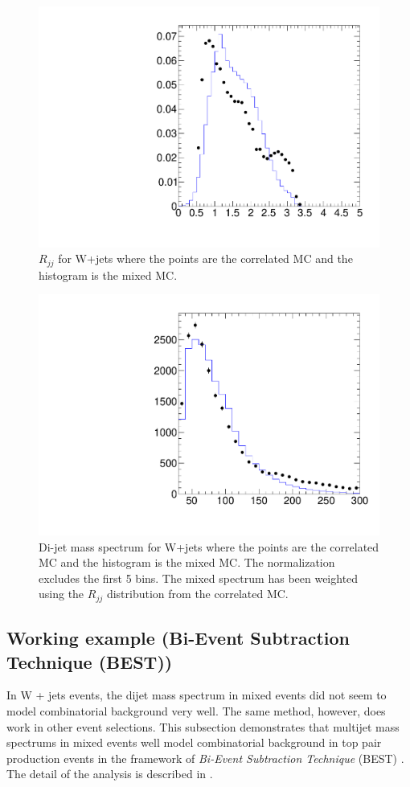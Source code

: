 \begin{figure}[!h]
\begin{center}
\includegraphics[width=0.6\columnwidth]{figs/mixed_Rjj}
\end{center}
\caption{\label{fig:Rjj_mixed}$R_{jj}$ for W+jets where
the points are the correlated MC and the histogram is the mixed MC.}
\end{figure}

\begin{figure}[!h]
\begin{center}
\includegraphics[width=0.6\columnwidth]{figs/mixed_Mjj_weighted}
\end{center}
\caption{\label{fig:mjj_mixed_w}Di-jet mass spectrum for W+jets where
the points are the correlated MC and the histogram is the mixed MC.  The 
normalization excludes the first 5 bins.  The mixed spectrum has been 
weighted using the $R_{jj}$ distribution from the correlated MC.}
\end{figure}

\clearpage

\subsection{Working example (Bi-Event Subtraction Technique (BEST))}


In W + jets events, the dijet mass spectrum in mixed events did not seem
to model combinatorial background very well. The same method, however,
does work in other event selections. This subsection demonstrates that
multijet mass spectrums in mixed events well model combinatorial
background in top pair production events in the framework of
\textit{Bi-Event Subtraction Technique} (BEST) \cite{Dutta:2011gs}.
The detail of the analysis is described in \cite{CMS-AN-2011-396}.

